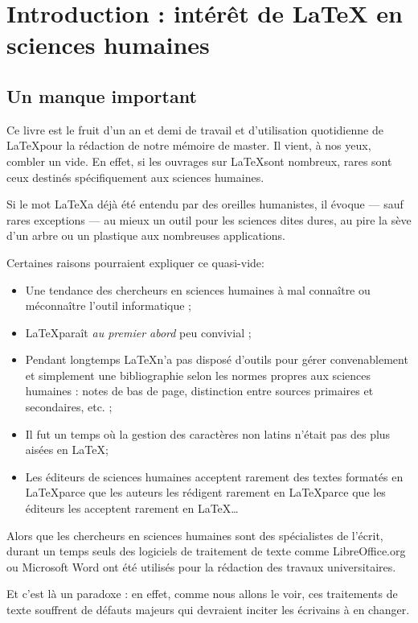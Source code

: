 \chapter[Introduction]{Introduction : intérêt de \LaTeX{} en sciences humaines}

\section{Un manque important}

Ce livre est le fruit d'un an et demi de travail et d'utilisation quotidienne de \LaTeX pour la rédaction de notre mémoire de master. Il vient, à nos yeux,  combler un vide. En effet, si les ouvrages sur \LaTeX sont nombreux, rares sont ceux destinés  spécifiquement aux sciences humaines. 

Si le mot \LaTeX a déjà été entendu par des oreilles humanistes, il évoque --- sauf rares exceptions --- au mieux un outil pour les sciences dites dures, au pire la sève d'un arbre ou un plastique aux nombreuses applications. 

Certaines raisons pourraient expliquer ce quasi-vide:
\begin{itemize}
\item Une tendance des chercheurs en sciences humaines à mal connaître ou méconnaître l'outil informatique ;
\item \LaTeX paraît \emph{au premier abord} peu convivial ;
\item Pendant longtemps \LaTeX n'a pas disposé d'outils pour gérer convenablement et simplement une bibliographie selon les normes propres aux sciences humaines : notes de bas de page, distinction entre sources primaires et secondaires, etc. ;
\item Il fut un temps où la gestion des caractères non latins n'était pas des plus aisées en \LaTeX ;
\item Les éditeurs de sciences humaines acceptent rarement des textes formatés en \LaTeX parce que les auteurs les rédigent rarement en \LaTeX parce que les éditeurs les acceptent rarement en \LaTeX\ldots
\end{itemize}

Alors que les chercheurs en sciences humaines sont des spécialistes de l'écrit, durant un temps seuls des logiciels de traitement de texte comme LibreOffice.org ou Microsoft Word ont été utilisés pour la rédaction des travaux universitaires.

Et c'est là un paradoxe : en effet, comme nous allons le voir, ces traitements de texte souffrent de défauts majeurs qui devraient inciter les écrivains à en changer. 


